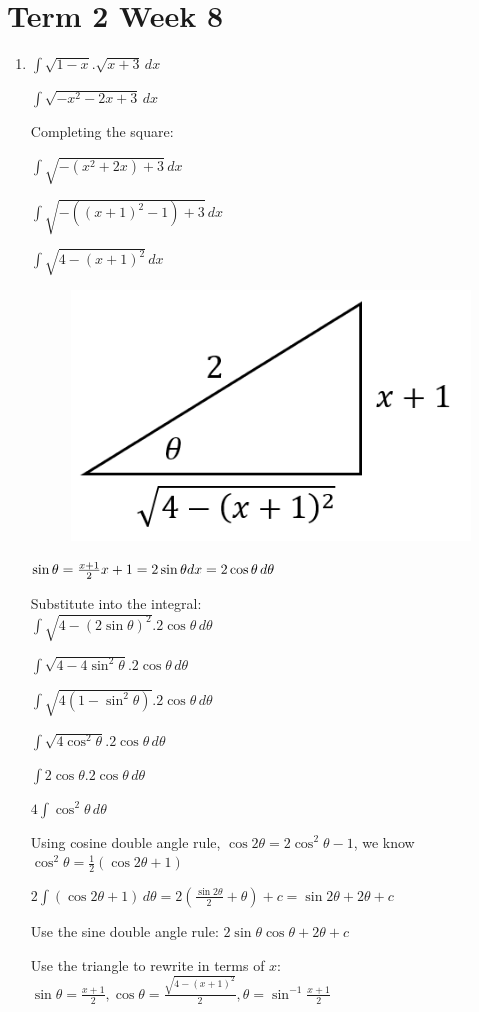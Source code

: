 \documentclass[../main.tex]{subfiles}
\begin{document}
\section*{Term 2 Week 8}

\begin{enumerate}[itemsep=1cm]
    \item 
    \(\int \sqrt{1-x}.\sqrt{x+3}\,dx\)

    \(\int \sqrt{-x^2-2x+3}\,dx\)

    Completing the square:

    \(\int \sqrt{-(x^2+2x)+3}\,dx\)

    \(\int \sqrt{-((x+1)^2-1)+3}\,dx\)

    \(\int \sqrt{4-(x+1)^2}\,dx\)

    \begin{figure}[h]
        \includegraphics[width=0.25\linewidth]{../images/t2w8q1a.png}
    \end{figure}
    \(\sin{\theta}=\frac{x+1}{2}\\
    x+1=2\sin{\theta}\\
    dx=2\cos{\theta}\,d\theta\)

    Substitute into the integral:\\
    \(\int \sqrt{4-(2\sin{\theta})^2}.2\cos{\theta}\,d\theta\)

    \(\int \sqrt{4-4\sin^2{\theta}}.2\cos{\theta}\,d\theta\)

    \(\int \sqrt{4(1-\sin^2{\theta})}.2\cos{\theta}\,d\theta\)

    \(\int \sqrt{4\cos^2{\theta}}.2\cos{\theta}\,d\theta\)

    \(\int 2\cos{\theta}.2\cos{\theta}\,d\theta\)

    \(4\int \cos^2{\theta}\,d\theta\)

    Using cosine double angle rule, \(\cos{2\theta}=2\cos^2{\theta}-1\), we know \(\cos^2{\theta}=\frac{1}{2}(\cos{2\theta}+1)\)

    \(2\int (\cos{2\theta}+1)\,d\theta=2(\frac{\sin{2\theta}}{2}+\theta)+c=\sin{2\theta}+2\theta+c\)

    Use the sine double angle rule:
    \(2\sin{\theta}\cos{\theta}+2\theta+c\)

    Use the triangle to rewrite in terms of \(x\):
    \(\sin{\theta}=\frac{x+1}{2}, \cos{\theta}=\frac{\sqrt{4-(x+1)^2}}{2}, \theta=\sin^{-1}{\frac{x+1}{2}}\)


\end{enumerate}
\end{document}
